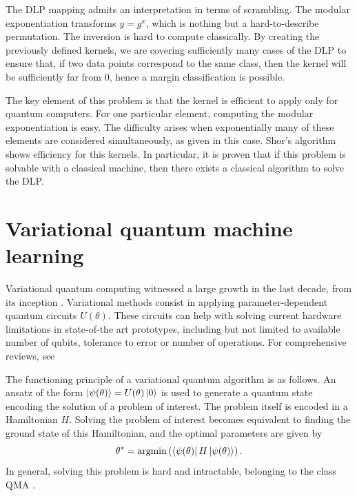 \documentclass[]{report}
\begin{document}
The DLP mapping admits an interpretation in terms of scrambling. The modular exponentiation transforms $y = g^x$, which is nothing but a hard-to-describe permutation. The inversion is hard to compute classically. By creating the previously defined kernels, we are covering sufficiently many cases of the DLP to ensure that, if two data points correspond to the same class, then the kernel will be sufficiently far from $0$, hence a margin classification is possible. 


The key element of this problem is that the kernel is efficient to apply only for quantum computers. For one particular element, computing the modular exponentiation is easy. The difficulty arises when exponentially many of these elements are considered simultaneously, as given in this case. Shor's algorithm \cite{shor1997polynomialtime} shows efficiency for this kernels. In particular, it is proven that if this problem is solvable with a classical machine, then there exists a classical algorithm to solve the DLP.  

\section{Variational quantum machine learning}\label{sec.variational}

Variational quantum computing witnessed a large growth in the last decade, from its inception \cite{peruzzo2014variational}. Variational methods consist in applying parameter-dependent quantum circuits $U(\theta)$. These circuits can help with solving current hardware limitations in state-of-the art prototypes, including but not limited to available number of qubits, tolerance to error or number of operations. For comprehensive reviews, see \cite{bharti2021noisy, cerezo2021variational}

The functioning principle of a variational quantum algorithm is as follows. An ansatz of the form $\ket{\psi(\theta)} = U(\theta)\ket 0$ is used to generate a quantum state encoding the solution of a problem of interest. The problem itself is encoded in a Hamiltonian $H$. Solving the problem of interest becomes equivalent to finding the ground state of this Hamiltonian, and the optimal parameters are given by
\begin{equation}
\theta^* = \operatorname{argmin}\left( \bra{\psi(\theta)}H\ket{\psi(\theta)}\right).
\end{equation}
In general, solving this problem is hard and intractable, belonging to the class QMA \cite{kempe2005complexity}.
\end{document}
